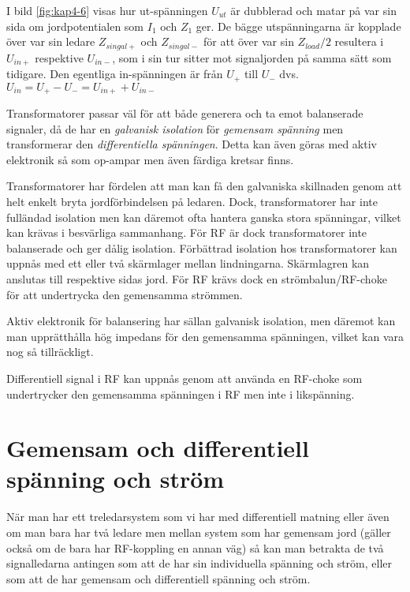 I bild \ref{fig:kap4-6} visas hur ut-spänningen \(U_{ut}\) är dubblerad och
matar på var sin sida om jordpotentialen som  \(I_{1}\) och \(Z_{1}\) ger.
De bägge utspänningarna är kopplade över var sin ledare \(Z_{singal+}\) och
\(Z_{singal-}\) för att över var sin \(Z_{load}/2\) resultera i \(U_{in+}\)
respektive \(U_{in-}\), som i sin tur sitter mot signaljorden på samma sätt
som tidigare.
Den egentliga in-spänningen är från \(U_{+}\) till \(U_{-}\) dvs.
\(U_{in} = U_{+} - U_{-} = U_{in+}+U_{in-}\)

Transformatorer passar väl för att både generera och ta emot balanserade
signaler, då de har en \emph{galvanisk isolation} för \emph{gemensam spänning}
men transformerar den \emph{differentiella spänningen}.
Detta kan även göras med aktiv elektronik så som op-ampar men även färdiga
kretsar finns.

Transformatorer har fördelen att man kan få den galvaniska skillnaden genom
att helt enkelt bryta jordförbindelsen på ledaren.
Dock, transformatorer har inte fulländad isolation men kan däremot ofta hantera
ganska stora spänningar, vilket kan krävas i besvärliga sammanhang.
För RF är dock transformatorer inte balanserade och ger dålig isolation.
Förbättrad isolation hos transformatorer kan uppnås med ett eller två
skärmlager mellan lindningarna.
Skärmlagren kan anslutas till respektive sidas jord.
För RF krävs dock en strömbalun/RF-choke för att undertrycka den
gemensamma strömmen.

Aktiv elektronik för balansering har sällan galvanisk isolation, men däremot
kan man upprätthålla hög impedans för den gemensamma spänningen, vilket kan
vara nog så tillräckligt.

Differentiell signal i RF kan uppnås genom att använda en RF-choke som
undertrycker den gemensamma spänningen i RF men inte i likspänning.

\section[Gemensam och diff]{Gemensam och differentiell spänning och ström}

När man har ett treledarsystem som vi har med differentiell matning eller
även om man bara har två ledare men mellan system som har gemensam jord
(gäller också om de bara har RF-koppling en annan väg) så kan man betrakta
de två signalledarna antingen som att de har sin individuella spänning och
ström, eller som att de har gemensam och differentiell spänning och ström.

